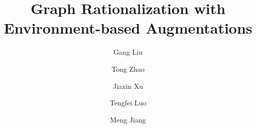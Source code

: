 \documentclass[sigconf]{acmart}
\begin{document}
\title{Graph Rationalization with Environment-based Augmentations} 



\author{Gang Liu} 

\author{Tong Zhao} 

\author{Jiaxin Xu} 

\author{Tengfei Luo} 

\author{Meng Jiang} 

\newcommand{\method}{\textsc{GREA}\xspace}

\newcommand{\unets}{\textsc{U-NetsPool}\xspace}
\newcommand{\selfattn}{\textsc{SelfAttnPool}\xspace}
\newcommand{\stablegnn}{\textsc{StableGNN}\xspace}
\newcommand{\oodgnn}{\textsc{OOD-GNN}\xspace}
\newcommand{\irm}{\textsc{IRM}\xspace}
\newcommand{\dir}{\textsc{DIR}\xspace}
\newcommand{\gcn}{\textsc{GCN}\xspace}
\newcommand{\gin}{\textsc{GIN}\xspace}

\newcommand{\dirplusaug}{\textsc{DIR}\textsc{RepAug}\xspace}
\newcommand{\methodnoaug}{\textsc{GREA}\textsc{RepAug}\xspace}

\newcommand{\overbar}[1]{\mkern 1.5mu\overline{\mkern-1.5mu#1\mkern-1.5mu}\mkern 1.5mu}

\newcommand{\glassTemp}{{GlassTemp}\xspace}
\newcommand{\meltTemp}{{MeltingTemp}\xspace}
\newcommand{\density}{{PolyDensity}\xspace}
\newcommand{\oxygen}{{OPerm}\xspace}

\newcommand{\hiv}{{ogbg-HIV}\xspace}
\newcommand{\toxcast}{{ogbg-ToxCast}\xspace}
\newcommand{\toxt}{{ogbg-Tox21}\xspace}
\newcommand{\bace}{{ogbg-BACE}\xspace}
\newcommand{\bbbp}{{ogbg-BBBP}\xspace}
\newcommand{\clintox}{{ogbg-ClinTox}\xspace}
\newcommand{\sider}{{ogbg-SIDER}\xspace}

\newcommand{\regreRSquare}{{R}\xspace}
\newcommand{\regreRMSE}{{RMSE}\xspace}
\newcommand{\classifyAUC}{{AUC}\xspace}
\end{document}
